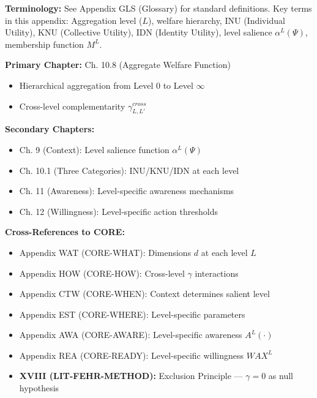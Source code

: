 
\begin{tcolorbox}[colback=gray!5!white, colframe=gray!50!black]
\textbf{Terminology:} See Appendix GLS (Glossary) for standard definitions.
Key terms in this appendix: Aggregation level ($L$), welfare hierarchy,
INU (Individual Utility), KNU (Collective Utility), IDN (Identity Utility),
level salience $\alpha^L(\Psi)$, membership function $M^L$.
\end{tcolorbox}

\begin{tcolorbox}[colback=green!5!white, colframe=green!75!black,
    title=\textbf{Chapter References}]

\textbf{Primary Chapter:} Ch. 10.8 (Aggregate Welfare Function)
\begin{itemize}[nosep]
    \item Hierarchical aggregation from Level 0 to Level $\infty$
    \item Cross-level complementarity $\gamma^{cross}_{L,L'}$
\end{itemize}

\textbf{Secondary Chapters:}
\begin{itemize}[nosep]
    \item Ch. 9 (Context): Level salience function $\alpha^L(\Psi)$
    \item Ch. 10.1 (Three Categories): INU/KNU/IDN at each level
    \item Ch. 11 (Awareness): Level-specific awareness mechanisms
    \item Ch. 12 (Willingness): Level-specific action thresholds
\end{itemize}

\textbf{Cross-References to CORE:}
\begin{itemize}[nosep]
    \item Appendix WAT (CORE-WHAT): Dimensions $d$ at each level $L$
    \item Appendix HOW (CORE-HOW): Cross-level $\gamma$ interactions
    \item Appendix CTW (CORE-WHEN): Context determines salient level
    \item Appendix EST (CORE-WHERE): Level-specific parameters
    \item Appendix AWA (CORE-AWARE): Level-specific awareness $A^L(\cdot)$
    \item Appendix REA (CORE-READY): Level-specific willingness $WAX^L$
    \item \textbf{XVIII (LIT-FEHR-METHOD):} Exclusion Principle --- $\gamma = 0$ as null hypothesis
\end{itemize}

\end{tcolorbox}

